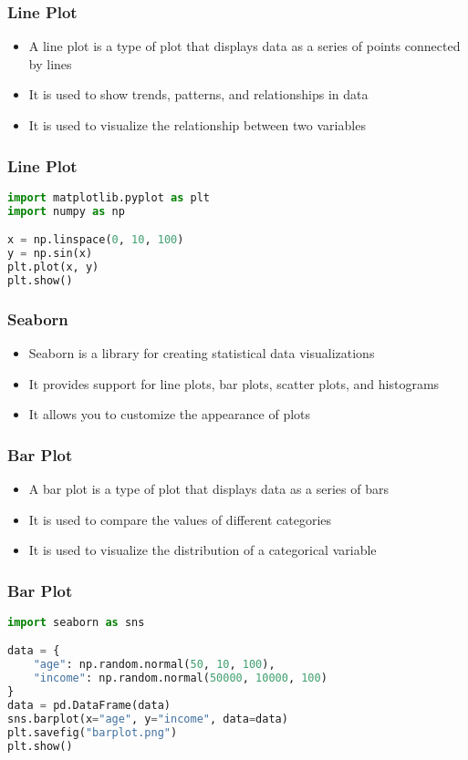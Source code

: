 \documentclass[serif, 9pt, aspectratio=32]{beamer}
\begin{document}
\begin{frame}
    \centering
    \frametitle{Line Plot}
    \begin{itemize}
        \setlength{\itemsep}{2em}
        \item A line plot is a type of plot that displays data as a series of points connected by lines
        \item It is used to show trends, patterns, and relationships in data
        \item It is used to visualize the relationship between two variables
    \end{itemize}
\end{frame}

\begin{frame}[fragile]
    \frametitle{Line Plot}
    \begin{lstlisting}[language=Python]
import matplotlib.pyplot as plt
import numpy as np

x = np.linspace(0, 10, 100)
y = np.sin(x)
plt.plot(x, y)
plt.show()
    \end{lstlisting}
\end{frame}

\begin{frame}
    \centering
    \frametitle{Seaborn}
    \begin{itemize}
        \setlength{\itemsep}{2em}
        \item Seaborn is a library for creating statistical data visualizations
        \item It provides support for line plots, bar plots, scatter plots, and histograms
        \item It allows you to customize the appearance of plots
    \end{itemize}
\end{frame}

\begin{frame}
    \centering
    \frametitle{Bar Plot}
    \begin{itemize}
        \setlength{\itemsep}{2em}
        \item A bar plot is a type of plot that displays data as a series of bars
        \item It is used to compare the values of different categories
        \item It is used to visualize the distribution of a categorical variable
    \end{itemize}
\end{frame}

\begin{frame}[fragile]
    \frametitle{Bar Plot}
    \begin{lstlisting}[language=Python]
import seaborn as sns

data = {
    "age": np.random.normal(50, 10, 100),
    "income": np.random.normal(50000, 10000, 100)
}
data = pd.DataFrame(data)
sns.barplot(x="age", y="income", data=data)
plt.savefig("barplot.png")
plt.show()
    \end{lstlisting}
\end{frame}
\end{document}
